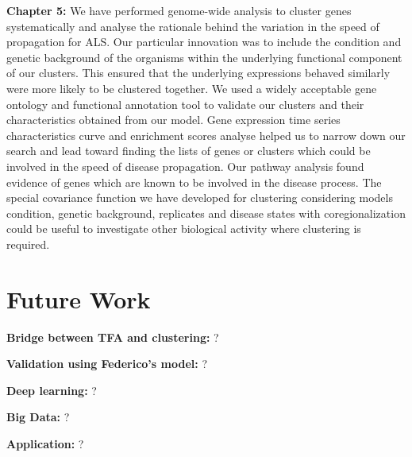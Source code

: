 \textbf{Chapter 5:} We have performed genome-wide analysis to cluster genes systematically and analyse the rationale behind the variation in the speed of propagation for ALS. Our particular innovation was to include the condition and genetic background of the organisms within the underlying functional component of our clusters. This ensured that the underlying expressions behaved similarly were more likely to be clustered together. We used a widely acceptable gene ontology and functional annotation tool to validate our clusters and their characteristics obtained from our model. Gene expression time series characteristics curve and enrichment scores analyse helped us to narrow down our search and lead toward finding the lists of genes or clusters which could be involved in the speed of disease propagation. Our pathway analysis found evidence of genes which are known to be involved in the disease process. The special covariance function we have developed for clustering considering models condition, genetic background, replicates and disease states with coregionalization could be useful to investigate other biological activity where clustering is required. 

\section{Future Work}
\textbf{Bridge between TFA and clustering:} ?


\textbf{Validation using Federico's model:} ?


\textbf{Deep learning:} ?


\textbf{Big Data:} ?


\textbf{Application:} ?

